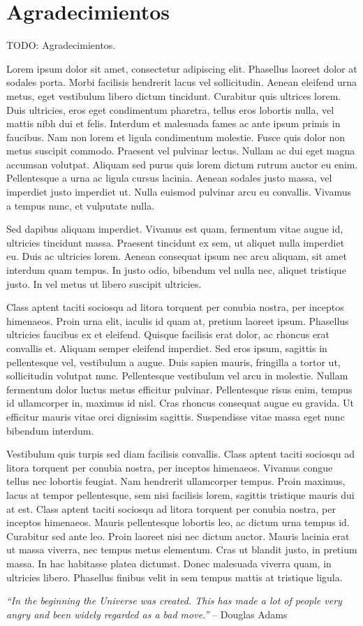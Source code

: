 \chapter*{Agradecimientos}

TODO: Agradecimientos.

Lorem ipsum dolor sit amet, consectetur adipiscing elit. Phasellus laoreet dolor at sodales porta. Morbi facilisis hendrerit lacus vel sollicitudin. Aenean eleifend urna metus, eget vestibulum libero dictum tincidunt. Curabitur quis ultrices lorem. Duis ultricies, eros eget condimentum pharetra, tellus eros lobortis nulla, vel mattis nibh dui et felis. Interdum et malesuada fames ac ante ipsum primis in faucibus. Nam non lorem et ligula condimentum molestie. Fusce quis dolor non metus suscipit commodo. Praesent vel pulvinar lectus. Nullam ac dui eget magna accumsan volutpat. Aliquam sed purus quis lorem dictum rutrum auctor eu enim. Pellentesque a urna ac ligula cursus lacinia. Aenean sodales justo massa, vel imperdiet justo imperdiet ut. Nulla euismod pulvinar arcu eu convallis. Vivamus a tempus nunc, et vulputate nulla.

Sed dapibus aliquam imperdiet. Vivamus est quam, fermentum vitae augue id, ultricies tincidunt massa. Praesent tincidunt ex sem, ut aliquet nulla imperdiet eu. Duis ac ultricies lorem. Aenean consequat ipsum nec arcu aliquam, sit amet interdum quam tempus. In justo odio, bibendum vel nulla nec, aliquet tristique justo. In vel metus ut libero suscipit ultricies.

Class aptent taciti sociosqu ad litora torquent per conubia nostra, per inceptos himenaeos. Proin urna elit, iaculis id quam at, pretium laoreet ipsum. Phasellus ultricies faucibus ex et eleifend. Quisque facilisis erat dolor, ac rhoncus erat convallis et. Aliquam semper eleifend imperdiet. Sed eros ipsum, sagittis in pellentesque vel, vestibulum a augue. Duis sapien mauris, fringilla a tortor ut, sollicitudin volutpat nunc. Pellentesque vestibulum vel arcu in molestie. Nullam fermentum dolor luctus metus efficitur pulvinar. Pellentesque risus enim, tempus id ullamcorper in, maximus id nisl. Cras rhoncus consequat augue eu gravida. Ut efficitur mauris vitae orci dignissim sagittis. Suspendisse vitae massa eget nunc bibendum interdum.

Vestibulum quis turpis sed diam facilisis convallis. Class aptent taciti sociosqu ad litora torquent per conubia nostra, per inceptos himenaeos. Vivamus congue tellus nec lobortis feugiat. Nam hendrerit ullamcorper tempus. Proin maximus, lacus at tempor pellentesque, sem nisi facilisis lorem, sagittis tristique mauris dui at est. Class aptent taciti sociosqu ad litora torquent per conubia nostra, per inceptos himenaeos. Mauris pellentesque lobortis leo, ac dictum urna tempus id. Curabitur sed ante leo. Proin laoreet nisi nec dictum auctor. Mauris lacinia erat ut massa viverra, nec tempus metus elementum. Cras ut blandit justo, in pretium massa. In hac habitasse platea dictumst. Donec malesuada viverra quam, in ultricies libero. Phasellus finibus velit in sem tempus mattis at tristique ligula.

\begin{flushright}
\textit{``In the beginning the Universe was created.
This has made a lot of people very angry and been widely regarded as a bad move.''}
-- Douglas Adams
\end{flushright}
